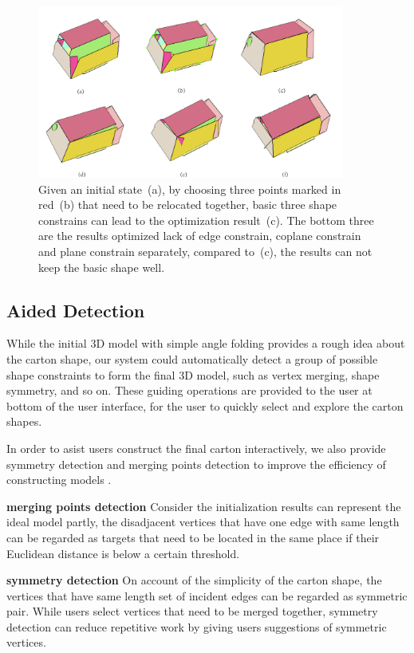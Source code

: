 \begin{figure}
	\centering
	\includegraphics[width=0.9\textwidth]{images/constrain.jpg}
	\caption{Given an initial state~(a), by choosing three points marked in red~(b) that need to be relocated together, basic three shape constrains can lead to the optimization result~(c). The bottom three are the results optimized lack of edge constrain, coplane constrain and plane constrain separately, compared to~(c), the results can not keep the basic shape well.}
	\label{fig:constrain}
\end{figure}


\subsection{Aided Detection}

While the initial 3D model with simple angle folding provides a rough idea about the carton shape, our system could automatically detect a group of possible shape constraints to form the final 3D model, such as vertex merging, shape symmetry, and so on. 
%
These guiding operations are provided to the user at bottom of the user interface, for the user to quickly select and explore the carton shapes.

%
In order to asist users construct the final carton interactively, we also provide symmetry detection and merging points detection to improve the efficiency of constructing models .

\noindent
\textbf{merging points detection} Consider the initialization results can represent the ideal model partly, the disadjacent vertices that have one edge with same length can be regarded as targets that need to be located in the same place if their Euclidean distance is below a certain threshold.

\noindent
\textbf{symmetry detection} On account of the simplicity of the carton shape, the vertices that have same length set of incident edges can be regarded as symmetric pair. While users select vertices that need to be merged together, symmetry detection can reduce repetitive work by giving users suggestions of symmetric vertices.